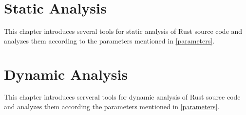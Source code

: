 \section{Static Analysis}
This chapter introduces several tools for static analysis of Rust source code and analyzes them according to the parameters mentioned in \autoref{parameters}.


\newpage

\newpage

\newpage

\newpage

\newpage

\section{Dynamic Analysis}
This chapter introduces serveral tools for dynamic analysis of Rust source code and analyzes them according the parameters mentioned in \autoref{parameters}.


\newpage